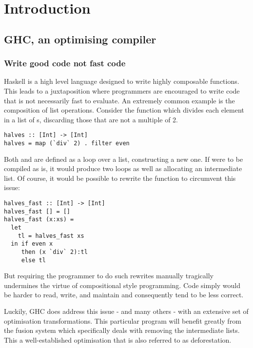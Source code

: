 \chapter{Introduction}

\section{GHC, an optimising compiler}

\subsection{Write good code not fast code}
Haskell is a high level language designed to write highly composable functions.
This leads to a juxtaposition where programmers are encouraged to write code that
is not necessarily fast to evaluate. An extremely common example is the composition
of list operations. Consider the function  which divides each element
in a list of s, discarding those that are not a multiple of 2.

\begin{listing}[H]
\begin{verbatim}
halves :: [Int] -> [Int]
halves = map (`div` 2) . filter even
\end{verbatim}
\end{listing}

Both  and  are defined as a loop over a list, constructing a new one. 
If  were to be compiled as is, it would produce two loops as well as allocating
an intermediate list. Of course, it would be possible to rewrite the function to circumvent this
issue:

\begin{listing}[H]
\begin{verbatim}
halves_fast :: [Int] -> [Int]
halves_fast [] = []
halves_fast (x:xs) = 
  let 
    tl = halves_fast xs 
  in if even x 
     then (x `div` 2):tl
     else tl
\end{verbatim}
\end{listing}

But requiring the programmer to do such rewrites manually tragically undermines
the virtue of compositional style programming. Code simply would be harder to read, write,
and maintain and consequently tend to be less correct. 

Luckily, GHC does address this issue - and many others - with an extensive set of optimisation transformations.
This particular program will benefit greatly from the fusion system which specifically deals with removing
the intermediate lists. This a well-established optimisation that is also referred to as deforestation. \cite{WADLER1990231}

